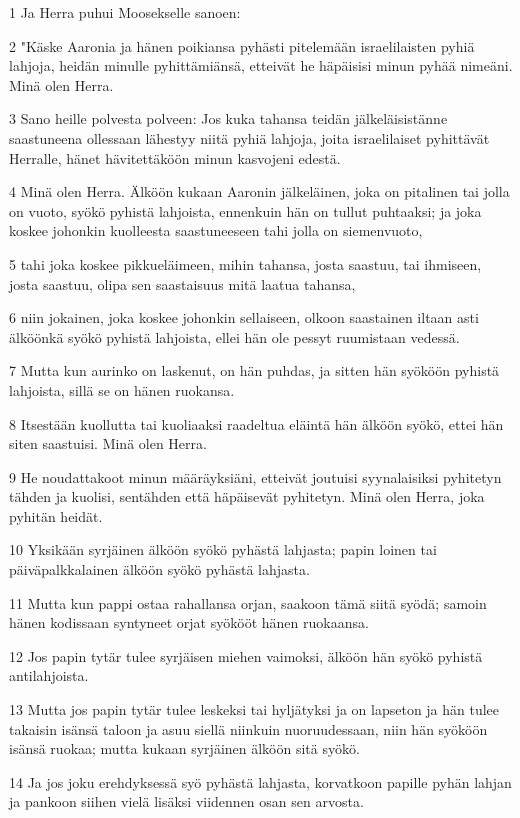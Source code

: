 \par 1 Ja Herra puhui Moosekselle sanoen:
\par 2 "Käske Aaronia ja hänen poikiansa pyhästi pitelemään israelilaisten pyhiä lahjoja, heidän minulle pyhittämiänsä, etteivät he häpäisisi minun pyhää nimeäni. Minä olen Herra.
\par 3 Sano heille polvesta polveen: Jos kuka tahansa teidän jälkeläisistänne saastuneena ollessaan lähestyy niitä pyhiä lahjoja, joita israelilaiset pyhittävät Herralle, hänet hävitettäköön minun kasvojeni edestä.
\par 4 Minä olen Herra. Älköön kukaan Aaronin jälkeläinen, joka on pitalinen tai jolla on vuoto, syökö pyhistä lahjoista, ennenkuin hän on tullut puhtaaksi; ja joka koskee johonkin kuolleesta saastuneeseen tahi jolla on siemenvuoto,
\par 5 tahi joka koskee pikkueläimeen, mihin tahansa, josta saastuu, tai ihmiseen, josta saastuu, olipa sen saastaisuus mitä laatua tahansa,
\par 6 niin jokainen, joka koskee johonkin sellaiseen, olkoon saastainen iltaan asti älköönkä syökö pyhistä lahjoista, ellei hän ole pessyt ruumistaan vedessä.
\par 7 Mutta kun aurinko on laskenut, on hän puhdas, ja sitten hän syököön pyhistä lahjoista, sillä se on hänen ruokansa.
\par 8 Itsestään kuollutta tai kuoliaaksi raadeltua eläintä hän älköön syökö, ettei hän siten saastuisi. Minä olen Herra.
\par 9 He noudattakoot minun määräyksiäni, etteivät joutuisi syynalaisiksi pyhitetyn tähden ja kuolisi, sentähden että häpäisevät pyhitetyn. Minä olen Herra, joka pyhitän heidät.
\par 10 Yksikään syrjäinen älköön syökö pyhästä lahjasta; papin loinen tai päiväpalkkalainen älköön syökö pyhästä lahjasta.
\par 11 Mutta kun pappi ostaa rahallansa orjan, saakoon tämä siitä syödä; samoin hänen kodissaan syntyneet orjat syökööt hänen ruokaansa.
\par 12 Jos papin tytär tulee syrjäisen miehen vaimoksi, älköön hän syökö pyhistä antilahjoista.
\par 13 Mutta jos papin tytär tulee leskeksi tai hyljätyksi ja on lapseton ja hän tulee takaisin isänsä taloon ja asuu siellä niinkuin nuoruudessaan, niin hän syököön isänsä ruokaa; mutta kukaan syrjäinen älköön sitä syökö.
\par 14 Ja jos joku erehdyksessä syö pyhästä lahjasta, korvatkoon papille pyhän lahjan ja pankoon siihen vielä lisäksi viidennen osan sen arvosta.
